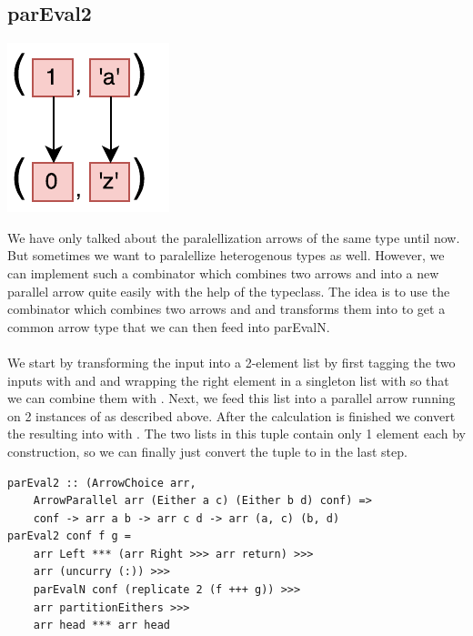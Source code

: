 \subsection{parEval2}
\begin{center}
	\includegraphics[scale=0.7]{images/parEval2}
\end{center}
We have only talked about the paralellization arrows of the same type until now. But sometimes we want to paralellize heterogenous types as well. However, we can implement such a  combinator which combines two arrows  and  into a new parallel arrow  quite easily with the help of the  typeclass. The idea is to use the \code{+++} combinator which combines two arrows  and  and transforms them into  to get a common arrow type that we can then feed into parEvalN.
\\\\
We start by transforming the  input into a 2-element list \code{[Either a c]} by first tagging the two inputs with  and  and wrapping the right element in a singleton list with  so that we can combine them with . Next, we feed this list into a parallel arrow running on 2 instances of  as described above. After the calculation is finished we convert the resulting \code{[Either b d]} into \code{([b], [d])} with . The two lists in this tuple contain only 1 element each by construction, so we can finally just convert the tuple to  in the last step.
\begin{lstlisting}[frame=htrbl]
parEval2 :: (ArrowChoice arr,
	ArrowParallel arr (Either a c) (Either b d) conf) =>
	conf -> arr a b -> arr c d -> arr (a, c) (b, d)
parEval2 conf f g = 
	arr Left *** (arr Right >>> arr return) >>>
	arr (uncurry (:)) >>>
	parEvalN conf (replicate 2 (f +++ g)) >>>
	arr partitionEithers >>>
	arr head *** arr head
\end{lstlisting}
